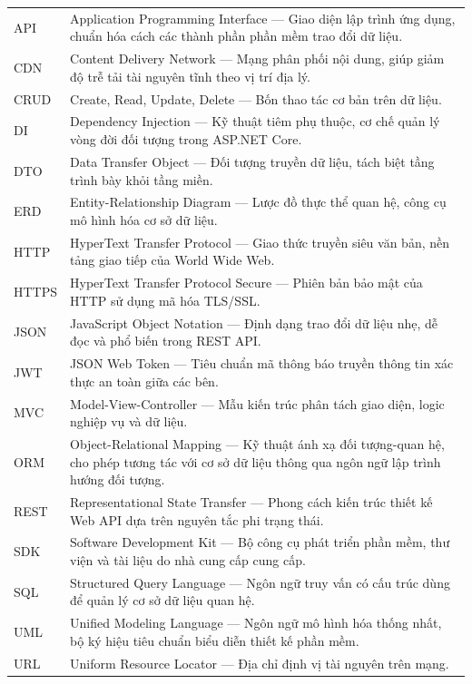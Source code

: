 \begin{longtable}{p{3.2cm} p{10.8cm}}
\hline
API     & Application Programming Interface — Giao diện lập trình ứng dụng, chuẩn hóa cách các thành phần phần mềm trao đổi dữ liệu. \\
CDN     & Content Delivery Network — Mạng phân phối nội dung, giúp giảm độ trễ tải tài nguyên tĩnh theo vị trí địa lý. \\
CRUD    & Create, Read, Update, Delete — Bốn thao tác cơ bản trên dữ liệu. \\
DI      & Dependency Injection — Kỹ thuật tiêm phụ thuộc, cơ chế quản lý vòng đời đối tượng trong ASP.NET Core. \\
DTO     & Data Transfer Object — Đối tượng truyền dữ liệu, tách biệt tầng trình bày khỏi tầng miền. \\
ERD     & Entity-Relationship Diagram — Lược đồ thực thể quan hệ, công cụ mô hình hóa cơ sở dữ liệu. \\
HTTP    & HyperText Transfer Protocol — Giao thức truyền siêu văn bản, nền tảng giao tiếp của World Wide Web. \\
HTTPS   & HyperText Transfer Protocol Secure — Phiên bản bảo mật của HTTP sử dụng mã hóa TLS/SSL. \\
JSON    & JavaScript Object Notation — Định dạng trao đổi dữ liệu nhẹ, dễ đọc và phổ biến trong REST API. \\
JWT     & JSON Web Token — Tiêu chuẩn mã thông báo truyền thông tin xác thực an toàn giữa các bên. \\
MVC     & Model-View-Controller — Mẫu kiến trúc phân tách giao diện, logic nghiệp vụ và dữ liệu. \\
ORM     & Object-Relational Mapping — Kỹ thuật ánh xạ đối tượng-quan hệ, cho phép tương tác với cơ sở dữ liệu thông qua ngôn ngữ lập trình hướng đối tượng. \\
REST    & Representational State Transfer — Phong cách kiến trúc thiết kế Web API dựa trên nguyên tắc phi trạng thái. \\
SDK     & Software Development Kit — Bộ công cụ phát triển phần mềm, thư viện và tài liệu do nhà cung cấp cung cấp. \\
SQL     & Structured Query Language — Ngôn ngữ truy vấn có cấu trúc dùng để quản lý cơ sở dữ liệu quan hệ. \\
UML     & Unified Modeling Language — Ngôn ngữ mô hình hóa thống nhất, bộ ký hiệu tiêu chuẩn biểu diễn thiết kế phần mềm. \\
URL     & Uniform Resource Locator — Địa chỉ định vị tài nguyên trên mạng. \\


\end{longtable}

